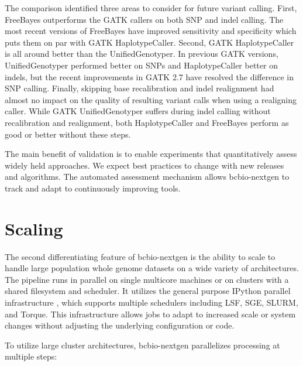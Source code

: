 \documentclass{frontiersSCNS}
\begin{document}
The comparison identified three areas to consider for future variant calling.
First, FreeBayes outperforms the GATK callers on both SNP and indel calling. The
most recent versions of FreeBayes have improved sensitivity and specificity
which puts them on par with GATK HaplotypeCaller. Second, GATK HaplotypeCaller
is all around better than the UnifiedGenotyper. In previous GATK versions,
UnifiedGenotyper performed better on SNPs and HaplotypeCaller
better on indels, but the recent improvements in GATK 2.7 have resolved the
difference in SNP calling. Finally, skipping base recalibration and indel
realignment had almost no impact on the quality of resulting variant calls when
using a realigning caller.  While GATK UnifiedGenotyper suffers during indel
calling without recalibration and realignment, both HaplotypeCaller and
FreeBayes perform as good or better without these steps.

The main benefit of validation is to enable experiments that quantitatively
assess widely held approaches. We expect best practices to change with new
releases and algorithms. The automated assessment mechanism allows
bcbio-nextgen to track and adapt to continuously improving tools.

\FloatBarrier

\section*{Scaling}

The second differentiating feature of bcbio-nextgen is the ability to scale to
handle large population whole genome datasets on a wide variety of
architectures. The pipeline runs in parallel on single multicore machines or on
clusters with a shared filesystem and scheduler. It utilizes the general purpose
IPython parallel infrastructure \citep{IPython}, which supports multiple
schedulers including LSF, SGE, SLURM, and Torque. This infrastructure allows
jobs to adapt to increased scale or system changes without adjusting the
underlying configuration or code.

To utilize large cluster architectures, bcbio-nextgen parallelizes
processing at multiple steps:
\end{document}
